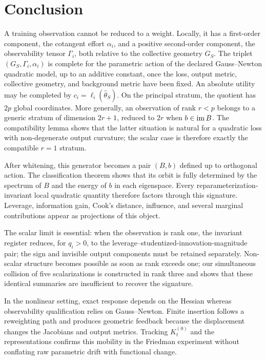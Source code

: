 \section{Conclusion}
A training observation cannot be reduced to a weight. Locally, it has a first-order component, the cotangent effort $\alpha_i$, and a positive second-order component, the observability tensor $\Gamma_i$, both relative to the collective geometry $G_S$. The triplet $(G_S,\Gamma_i,\alpha_i)$ is complete for the parametric action of the declared Gauss--Newton quadratic model, up to an additive constant, once the loss, output metric, collective geometry, and background metric have been fixed. An absolute utility may be completed by $c_i=\ell_i(\widehat\theta_S)$. On the principal stratum, the quotient has $2p$ global coordinates. More generally, an observation of rank $r<p$ belongs to a generic stratum of dimension $2r+1$, reduced to $2r$ when $b\in\operatorname{im} B$. The compatibility lemma shows that the latter situation is natural for a quadratic loss with non-degenerate output curvature; the scalar case is therefore exactly the compatible $r=1$ stratum.

After whitening, this generator becomes a pair $(B,b)$ defined up to orthogonal action. The classification theorem shows that its orbit is fully determined by the spectrum of $B$ and the energy of $b$ in each eigenspace. Every reparameterization-invariant local quadratic quantity therefore factors through this signature. Leverage, information gain, Cook's distance, influence, and several marginal contributions appear as projections of this object.

The scalar limit is essential: when the observation is rank one, the invariant register reduces, for $q_i>0$, to the leverage--studentized-innovation-magnitude pair; the sign and invisible output components must be retained separately. Non-scalar structure becomes possible as soon as rank exceeds one; our simultaneous collision of five scalarizations is constructed in rank three and shows that these identical summaries are insufficient to recover the signature.

In the nonlinear setting, exact response depends on the Hessian whereas observability qualification relies on Gauss--Newton. Finite insertion follows a reweighting path and produces geometric feedback because the displacement changes the Jacobians and output metrics. Tracking $K_t^{(0)}$ and the representations confirms this mobility in the Friedman experiment without conflating raw parametric drift with functional change.

